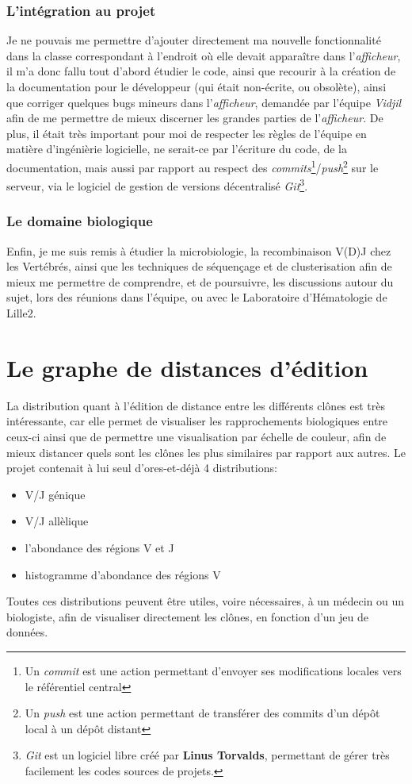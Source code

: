 \documentclass[12pt]{report}
\begin{document}
\begin{spacing}{1.2}
\subsection{L'intégration au projet}
Je ne pouvais me permettre d'ajouter directement ma nouvelle fonctionnalité dans la classe correspondant à l'endroit où elle devait apparaître dans l'\textit{afficheur}, il m'a donc fallu tout d'abord étudier le code, ainsi que recourir à la création de la documentation pour le développeur (qui était non-écrite, ou obsolète), ainsi que corriger quelques bugs mineurs dans l'\textit{afficheur}, demandée par l'équipe \textit{Vidjil} afin de me permettre de mieux discerner les grandes parties de l'\textit{afficheur}.
\newline
De plus, il était très important pour moi de respecter les règles de l'équipe en matière d'ingénièrie logicielle, ne serait-ce par l'écriture du code, de la documentation, mais aussi par rapport au respect des \textit{commits}\footnote{Un \textit{commit} est une action permettant d'envoyer ses modifications locales vers le référentiel central}/\textit{push}\footnote{Un \textit{push} est une action permettant de transférer des commits d'un dépôt local à un dépôt distant} sur le serveur, via le logiciel de gestion de versions décentralisé \textit{Git}\footnote{\textit{Git} est un logiciel libre créé par \textbf{Linus Torvalds}, permettant de gérer très facilement les codes sources de projets.}.

\subsection{Le domaine biologique}
Enfin, je me suis remis à étudier la microbiologie, la recombinaison V(D)J chez les Vertébrés, ainsi que les techniques de séquençage et de clusterisation afin de mieux me permettre de comprendre, et de poursuivre, les discussions autour du sujet, lors des réunions dans l'équipe, ou avec le Laboratoire d'Hématologie de Lille2.

\chapter{Le graphe de distances d'édition}


La distribution quant à l'édition de distance entre les différents clônes est très intéressante, car elle permet de visualiser les rapprochements biologiques entre ceux-ci ainsi que de permettre une visualisation par échelle de couleur, afin de mieux distancer quels sont les clônes les plus similaires par rapport aux autres.
\newline
Le projet contenait à lui seul d'ores-et-déjà 4 distributions:
\begin{itemize}
\item V/J génique
\item V/J allèlique
\item l'abondance des régions V et J
\item histogramme d'abondance des régions V
\end{itemize}
Toutes ces distributions peuvent être utiles, voire nécessaires, à un médecin ou un biologiste, afin de visualiser directement les clônes, en fonction d'un jeu de données.


\end{spacing}
\end{document}
